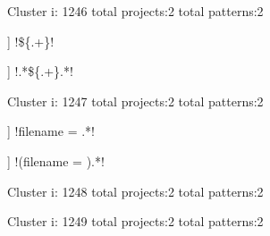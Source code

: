 Cluster i: 1246
total projects:2
total patterns:2
\begin{multicols}{1}
\begin{description}[noitemsep,topsep=0pt]
\item [[2] ] \cverb!\$\{.+\}!
\item [[2] ] \cverb!.*\$\{.+\}.*!
\end{description}
\end{multicols}







Cluster i: 1247
total projects:2
total patterns:2
\begin{multicols}{1}
\begin{description}[noitemsep,topsep=0pt]
\item [[2] ] \cverb!filename = .*!
\item [[2] ] \cverb!(filename = ).*!
\end{description}
\end{multicols}







Cluster i: 1248
total projects:2
total patterns:2
\begin{multicols}{1}
\begin{description}[noitemsep,topsep=0pt]
\item [[2] ] \cverb![$][{]\d+:([^}]+)[}]!
\item [[2] ] \cverb!(\$\{)\d+(:[^}]+\})!
\end{description}
\end{multicols}







Cluster i: 1249
total projects:2
total patterns:2
\begin{multicols}{1}
\end{multicols}







